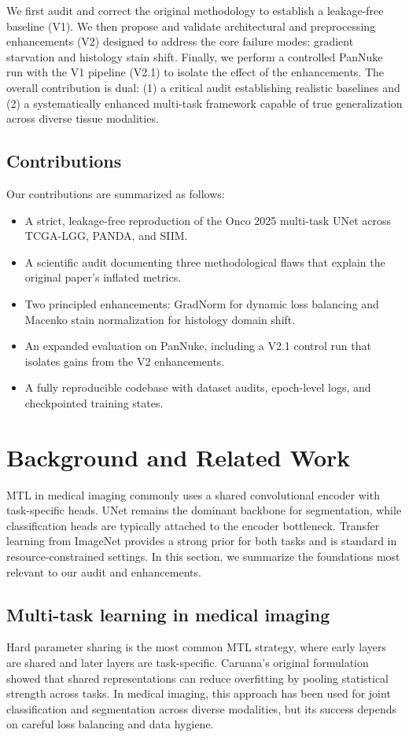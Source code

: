 \documentclass[conference,a4paper]{IEEEtran}
\begin{document}
We first audit and correct the original methodology to establish a leakage-free baseline (V1). We then propose and validate architectural and preprocessing enhancements (V2) designed to address the core failure modes: gradient starvation and histology stain shift. Finally, we perform a controlled PanNuke run with the V1 pipeline (V2.1) to isolate the effect of the enhancements. The overall contribution is dual: (1) a critical audit establishing realistic baselines and (2) a systematically enhanced multi-task framework capable of true generalization across diverse tissue modalities.

\subsection{Contributions}
Our contributions are summarized as follows:
\begin{itemize}
    \item A strict, leakage-free reproduction of the Onco 2025 multi-task UNet across TCGA-LGG, PANDA, and SIIM.
    \item A scientific audit documenting three methodological flaws that explain the original paper's inflated metrics.
    \item Two principled enhancements: GradNorm for dynamic loss balancing and Macenko stain normalization for histology domain shift.
    \item An expanded evaluation on PanNuke, including a V2.1 control run that isolates gains from the V2 enhancements.
    \item A fully reproducible codebase with dataset audits, epoch-level logs, and checkpointed training states.
\end{itemize}

\section{Background and Related Work}
MTL in medical imaging commonly uses a shared convolutional encoder with task-specific heads. UNet remains the dominant backbone for segmentation, while classification heads are typically attached to the encoder bottleneck. Transfer learning from ImageNet provides a strong prior for both tasks and is standard in resource-constrained settings. In this section, we summarize the foundations most relevant to our audit and enhancements.

\subsection{Multi-task learning in medical imaging}
Hard parameter sharing is the most common MTL strategy, where early layers are shared and later layers are task-specific. Caruana's original formulation showed that shared representations can reduce overfitting by pooling statistical strength across tasks. In medical imaging, this approach has been used for joint classification and segmentation across diverse modalities, but its success depends on careful loss balancing and data hygiene.
\end{document}
